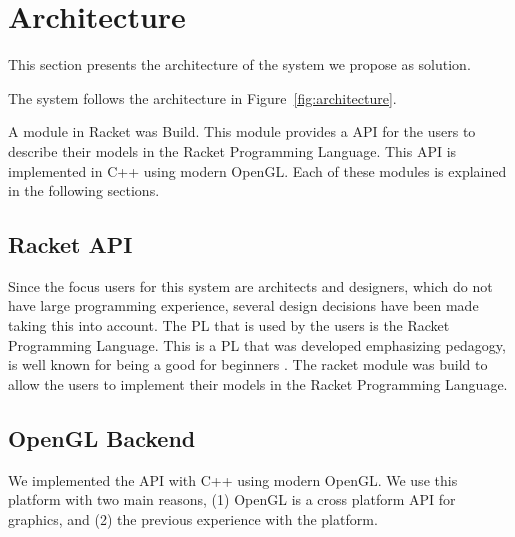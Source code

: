 

\section{Architecture} %
\label{sec:architecture}
This section presents the architecture of the system we propose as solution.

The system follows the architecture in Figure~\ref{fig:architecture}.

A module in Racket was Build. This module provides a \gls{API} for the users to describe their models in the Racket Programming Language.
This \gls{API} is implemented in C++ using modern OpenGL. Each of these modules is explained in the following sections.

\subsection{Racket API} %
\label{sub:racket_api}
Since the focus users for this system are architects and designers, which do not have large programming experience, several design decisions have been made taking this into account. The \gls{PL} that is used by the users is the Racket Programming Language. This is a \gls{PL} that was developed emphasizing pedagogy, is well known for being a good for beginners \cite{Findler1997}\cite{Findler2002}.
The racket module was build to allow the users to implement their models in the Racket Programming Language. 


\subsection{OpenGL Backend} %
\label{sub:opengl_backend}
We implemented the API with C++ using modern OpenGL. We use this platform with two main reasons, (1) OpenGL is a cross platform API for graphics, and (2) the previous experience with the platform.



